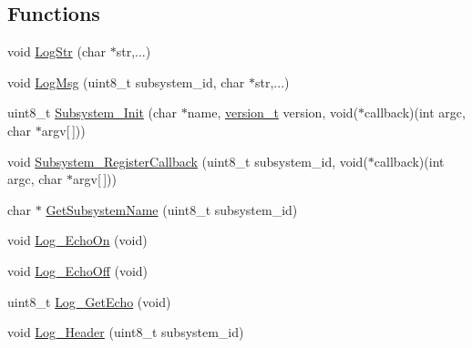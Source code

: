 \subsection*{Functions}
\begin{DoxyCompactItemize}
\item 
void \hyperlink{group__subsys_gad5c93d1d78ea66a8e631957653e03a74}{Log\+Str} (char $\ast$str,...)
\item 
void \hyperlink{group__subsys_gafb675e7cfe55b8b02e927e5c82a98ac0}{Log\+Msg} (uint8\+\_\+t subsystem\+\_\+id, char $\ast$str,...)
\item 
uint8\+\_\+t \hyperlink{group__subsys_ga4af744f35168691bbcdf5abe0b5ff4ca}{Subsystem\+\_\+\+Init} (char $\ast$name, \hyperlink{unionversion__t}{version\+\_\+t} version, void($\ast$callback)(int argc, char $\ast$argv\mbox{[}$\,$\mbox{]}))
\item 
void \hyperlink{group__subsys_ga1e9ede8a23cc1f69f6c9aef8f8718584}{Subsystem\+\_\+\+Register\+Callback} (uint8\+\_\+t subsystem\+\_\+id, void($\ast$callback)(int argc, char $\ast$argv\mbox{[}$\,$\mbox{]}))
\item 
char $\ast$ \hyperlink{group__subsys_ga6e52643db93bcc255c89cc27e644042d}{Get\+Subsystem\+Name} (uint8\+\_\+t subsystem\+\_\+id)
\item 
void \hyperlink{group__subsys_ga0788adbc985fe17ec878d3c0f9f06bff}{Log\+\_\+\+Echo\+On} (void)
\item 
void \hyperlink{group__subsys_gaaaddf9437be992e2ab59cbc7c6c8a913}{Log\+\_\+\+Echo\+Off} (void)
\item 
uint8\+\_\+t \hyperlink{group__subsys_ga8267834e6ee146c03ae4eba2eb0defc9}{Log\+\_\+\+Get\+Echo} (void)
\item 
void \hyperlink{group__subsys_gab04a3ed723beeb04411222c5ed8be911}{Log\+\_\+\+Header} (uint8\+\_\+t subsystem\+\_\+id)
\end{DoxyCompactItemize}


